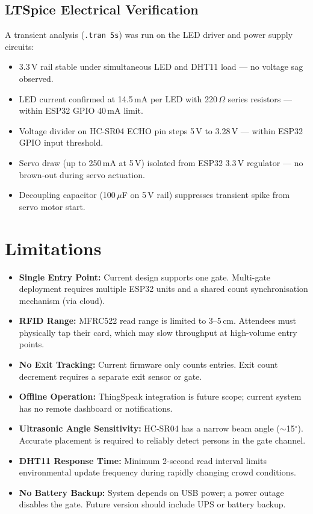 \documentclass[12pt,a4paper]{report}
\begin{document}
{\subsection{LTSpice Electrical Verification}

A transient analysis (\texttt{.tran 5s}) was run on the LED driver and power supply circuits:

\begin{itemize}[leftmargin=*]
    \item 3.3\,V rail stable under simultaneous LED and DHT11 load --- no voltage sag observed.
    \item LED current confirmed at 14.5\,mA per LED with 220\,$\Omega$ series resistors --- within ESP32 GPIO 40\,mA limit.
    \item Voltage divider on HC-SR04 ECHO pin steps 5\,V to 3.28\,V --- within ESP32 GPIO input threshold.
    \item Servo draw (up to 250\,mA at 5\,V) isolated from ESP32 3.3\,V regulator --- no brown-out during servo actuation.
    \item Decoupling capacitor (100\,$\mu$F on 5\,V rail) suppresses transient spike from servo motor start.
\end{itemize}

\section{Limitations}

\begin{itemize}[leftmargin=*]
    \item \textbf{Single Entry Point:} Current design supports one gate. Multi-gate deployment requires multiple ESP32 units and a shared count synchronisation mechanism (via cloud).
    \item \textbf{RFID Range:} MFRC522 read range is limited to 3--5\,cm. Attendees must physically tap their card, which may slow throughput at high-volume entry points.
    \item \textbf{No Exit Tracking:} Current firmware only counts entries. Exit count decrement requires a separate exit sensor or gate.
    \item \textbf{Offline Operation:} ThingSpeak integration is future scope; current system has no remote dashboard or notifications.
    \item \textbf{Ultrasonic Angle Sensitivity:} HC-SR04 has a narrow beam angle ($\sim$15$^\circ$). Accurate placement is required to reliably detect persons in the gate channel.
    \item \textbf{DHT11 Response Time:} Minimum 2-second read interval limits environmental update frequency during rapidly changing crowd conditions.
    \item \textbf{No Battery Backup:} System depends on USB power; a power outage disables the gate. Future version should include UPS or battery backup.
\end{itemize}

}
\end{document}
